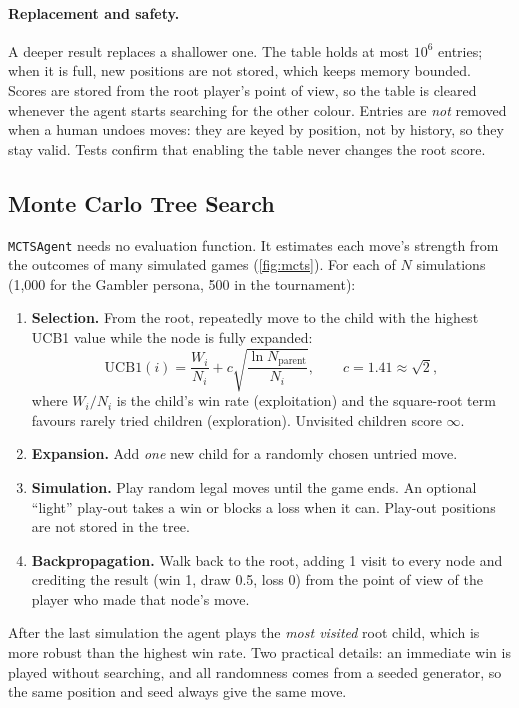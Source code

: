 \documentclass[11pt,a4paper]{article}
\newcommand{\code}[1]{\texttt{\small #1}}
\begin{document}
\paragraph{Replacement and safety.} A deeper result replaces a shallower one. The table holds at most $10^6$ entries; when it is full, new positions are not stored, which keeps memory bounded. Scores are stored from the root player's point of view, so the table is cleared whenever the agent starts searching for the other colour. Entries are \emph{not} removed when a human undoes moves: they are keyed by position, not by history, so they stay valid. Tests confirm that enabling the table never changes the root score.

\subsection{Monte Carlo Tree Search}
\code{MCTSAgent} needs no evaluation function. It estimates each move's strength from the outcomes of many simulated games (\cref{fig:mcts}). For each of $N$ simulations (1{,}000 for the Gambler persona, 500 in the tournament):

\begin{enumerate}
  \item \textbf{Selection.} From the root, repeatedly move to the child with the highest UCB1 value while the node is fully expanded:
  \begin{equation}
  \text{UCB1}(i) = \frac{W_i}{N_i} + c\sqrt{\frac{\ln N_{\text{parent}}}{N_i}}, \qquad c = 1.41 \approx \sqrt 2,
  \end{equation}
  where $W_i/N_i$ is the child's win rate (exploitation) and the square-root term favours rarely tried children (exploration). Unvisited children score $\infty$.
  \item \textbf{Expansion.} Add \emph{one} new child for a randomly chosen untried move.
  \item \textbf{Simulation.} Play random legal moves until the game ends. An optional ``light'' play-out takes a win or blocks a loss when it can. Play-out positions are not stored in the tree.
  \item \textbf{Backpropagation.} Walk back to the root, adding 1 visit to every node and crediting the result (win 1, draw 0.5, loss 0) from the point of view of the player who made that node's move.
\end{enumerate}
After the last simulation the agent plays the \emph{most visited} root child, which is more robust than the highest win rate. Two practical details: an immediate win is played without searching, and all randomness comes from a seeded generator, so the same position and seed always give the same move.
\end{document}
